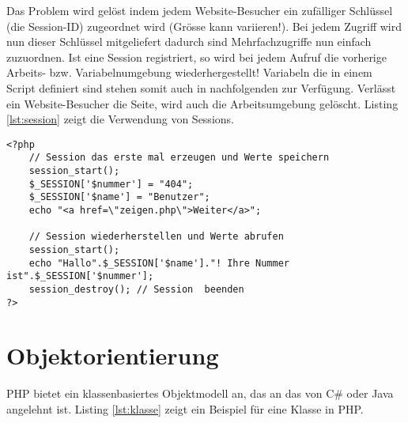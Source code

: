 Das Problem wird gelöst indem jedem Website-Besucher ein zufälliger Schlüssel (die Session-ID) zugeordnet wird (Grösse kann variieren!). Bei jedem Zugriff wird nun dieser Schlüssel mitgeliefert dadurch sind Mehrfachzugriffe nun einfach zuzuordnen. Ist eine Session registriert, so wird bei jedem Aufruf die vorherige Arbeits- bzw. Variabelnumgebung wiederhergestellt! Variabeln die in einem Script definiert sind stehen somit auch in nachfolgenden zur Verfügung. Verlässt ein Website-Besucher die Seite, wird auch die Arbeitsumgebung gelöscht. Listing \ref{lst:session} zeigt die Verwendung von Sessions.

\begin{lstlisting}[caption=Session, label=lst:session]
<?php
	// Session das erste mal erzeugen und Werte speichern
	session_start();
	$_SESSION['$nummer'] = "404";
	$_SESSION['$name'] = "Benutzer";
	echo "<a href=\"zeigen.php\">Weiter</a>";

	// Session wiederherstellen und Werte abrufen
	session_start();
	echo "Hallo".$_SESSION['$name']."! Ihre Nummer ist".$_SESSION['$nummer'];
	session_destroy(); // Session  beenden
?>
\end{lstlisting}

\section{Objektorientierung}

PHP bietet ein klassenbasiertes Objektmodell an, das an das von C\# oder Java angelehnt ist. Listing \ref{lst:klasse} zeigt ein Beispiel für eine Klasse in PHP.

